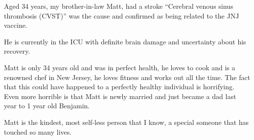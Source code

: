 Aged 34 years, my brother-in-law Matt, had a stroke “Cerebral venous sinus
thrombosis (CVST)” was the cause and confirmed as being related to the JNJ
vaccine.

He is currently in the ICU with definite brain damage and uncertainty about his
recovery.

Matt is only 34 years old and was in perfect health, he loves to cook and is a
renowned chef in New Jersey, he loves fitness and works out all the time. The
fact that this could have happened to a perfectly healthy individual is
horrifying. Even more horrible is that Matt is newly married and just became a
dad last year to 1 year old Benjamin.

Matt is the kindest, most self-less person that I know, a special someone that
has touched so many lives.

